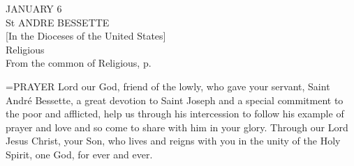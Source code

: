 \begin{center}\normalsize JANUARY 6\\
\footnotesize St ANDRE BESSETTE \\
\footnotesize [In the Dioceses of the United States]\\
\footnotesize Religious\\
\footnotesize From the common of Religious, p.\\
\end{center}

\hangindent=\parindent \small{PRAYER 
Lord our God, friend of the lowly,
who gave your servant, Saint André Bessette,
a great devotion to Saint Joseph
and a special commitment to the poor and afflicted,
help us through his intercession
to follow his example of prayer and love
and so come to share with him in your glory.
Through our Lord Jesus Christ, your Son,
who lives and reigns with you in the unity of the Holy Spirit,
one God, for ever and ever.\\}
 
 

